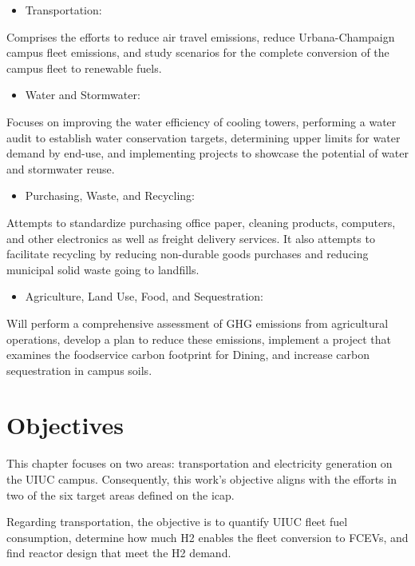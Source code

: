 \begin{itemize}
	\item Transportation:
\end{itemize}
Comprises the efforts to reduce air travel emissions, reduce Urbana-Champaign campus fleet emissions, and study scenarios for the complete conversion of the campus fleet to renewable fuels.

\begin{itemize}
	\item Water and Stormwater:
\end{itemize}
Focuses on improving the water efficiency of cooling towers, performing a water audit to establish water conservation targets, determining upper limits for water demand by end-use, and implementing projects to showcase the potential of water and stormwater reuse.

\begin{itemize}
	\item Purchasing, Waste, and Recycling:
\end{itemize}
Attempts to standardize purchasing office paper, cleaning products, computers, and other electronics as well as freight delivery services.
It also attempts to facilitate recycling by reducing non-durable goods purchases and reducing municipal solid waste going to landfills.

\begin{itemize}
	\item Agriculture, Land Use, Food, and Sequestration:
\end{itemize}
Will perform a comprehensive assessment of \gls{GHG} emissions from agricultural operations, develop a plan to reduce these emissions, implement a project that examines the foodservice carbon footprint for Dining, and increase carbon sequestration in campus soils.


\section{Objectives}
\label{sec:hydro-objectives}

This chapter focuses on two areas: transportation and electricity generation on the \gls{UIUC} campus.
Consequently, this work's objective aligns with the efforts in two of the six target areas defined on the \gls{icap}.

Regarding transportation, the objective is to quantify UIUC fleet fuel consumption, determine how much \gls{H2} enables the fleet conversion to \glspl{FCEV}, and find reactor design that meet the \gls{H2} demand.

